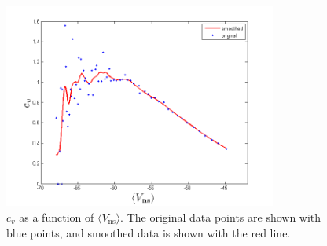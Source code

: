 \documentclass{scrartcl}
\begin{document}
\begin{figure}
\centering
\includegraphics[trim = {1.2cm 0 1cm 0.6cm}, width=0.8\textwidth, clip]{../pics/cv_aveV}
\caption{$c_v$ as a function of $\langle V_\mathrm{ns}\rangle$. The original data points are shown with blue points, and smoothed data is shown with the red line.}
\label{cv_aveV}
\end{figure}


\end{document}
